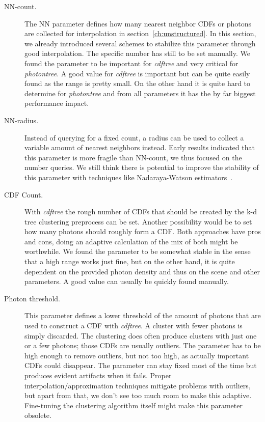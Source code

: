 \begin{description}
    \item[NN-count.] The NN parameter defines how many nearest neighbor CDFs or photons are collected for interpolation in section~\ref{ch:unstructured}. In this section, we already introduced several schemes to stabilize this parameter through good interpolation. The specific number has still to be set manually. We found the parameter to be important for \textit{cdftree} and very critical for \textit{photontree}. A good value for \textit{cdftree} is important but can be quite easily found as the range is pretty small. On the other hand it is quite hard to determine for \textit{photontree} and from all parameters it has the by far biggest performance impact.
    \item[NN-radius.] Instead of querying for a fixed count, a radius can be used to collect a variable amount of nearest neighbors instead. Early results indicated that this parameter is more fragile than NN-count, we thus focused on the number queries. We still think there is potential to improve the stability of this parameter with techniques like Nadaraya-Watson estimators~\parencite{nadaraya1964estimating}.
    \item[CDF Count.] With \textit{cdftree} the rough number of CDFs that should be created by the k-d tree clustering preprocess can be set. Another possibility would be to set how many photons should roughly form a CDF. Both approaches have pros and cons, doing an adaptive calculation of the mix of both might be worthwhile. We found the parameter to be somewhat stable in the sense that a high range works just fine, but on the other hand, it is quite dependent on the provided photon density and thus on the scene and other parameters. A good value can usually be quickly found manually.
    \item[Photon threshold.] This parameter defines a lower threshold of the amount of photons that are used to construct a CDF with \textit{cdftree}. A cluster with fewer photons is simply discarded. The clustering does often produce clusters with just one or a few photons; those CDFs are usually outliers. The parameter has to be high enough to remove outliers, but not too high, as actually important CDFs could disappear. The parameter can stay fixed most of the time but produces evident artifacts when it fails. Proper interpolation/approximation techniques mitigate problems with outliers, but apart from that, we don't see too much room to make this adaptive. Fine-tuning the clustering algorithm itself might make this parameter obsolete.
    
\end{description}

